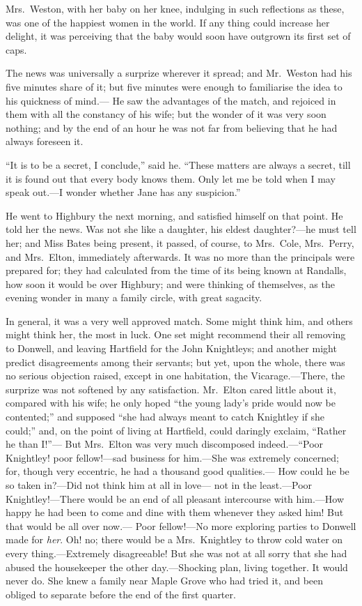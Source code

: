 Mrs.\ Weston, with her baby on her knee, indulging in such reflections
as these, was one of the happiest women in the world.  If any thing
could increase her delight, it was perceiving that the baby would
soon have outgrown its first set of caps.

The news was universally a surprize wherever it spread;
and Mr.\ Weston had his five minutes share of it; but five minutes
were enough to familiarise the idea to his quickness of mind.---%
He saw the advantages of the match, and rejoiced in them with all
the constancy of his wife; but the wonder of it was very soon nothing;
and by the end of an hour he was not far from believing that he
had always foreseen it.

``It is to be a secret, I conclude,'' said he.  ``These matters are
always a secret, till it is found out that every body knows them.
Only let me be told when I may speak out.---I wonder whether Jane has
any suspicion.''

He went to Highbury the next morning, and satisfied himself on
that point.  He told her the news.  Was not she like a daughter,
his eldest daughter?---he must tell her; and Miss Bates being present,
it passed, of course, to Mrs.\ Cole, Mrs.\ Perry, and Mrs.\ Elton,
immediately afterwards.  It was no more than the principals were
prepared for; they had calculated from the time of its being known
at Randalls, how soon it would be over Highbury; and were thinking
of themselves, as the evening wonder in many a family circle,
with great sagacity.

In general, it was a very well approved match.  Some might think him,
and others might think her, the most in luck.  One set might
recommend their all removing to Donwell, and leaving Hartfield
for the John Knightleys; and another might predict disagreements
among their servants; but yet, upon the whole, there was no serious
objection raised, except in one habitation, the Vicarage.---There,
the surprize was not softened by any satisfaction.  Mr.\ Elton
cared little about it, compared with his wife; he only hoped ``the
young lady's pride would now be contented;'' and supposed ``she had
always meant to catch Knightley if she could;'' and, on the point
of living at Hartfield, could daringly exclaim, ``Rather he than I!''---%
But Mrs.\ Elton was very much discomposed indeed.---``Poor Knightley!
poor fellow!---sad business for him.---She was extremely concerned;
for, though very eccentric, he had a thousand good qualities.---%
How could he be so taken in?---Did not think him at all in love---%
not in the least.---Poor Knightley!---There would be an end of all
pleasant intercourse with him.---How happy he had been to come and dine
with them whenever they asked him!  But that would be all over now.---%
Poor fellow!---No more exploring parties to Donwell made for \emph{her}.
Oh! no; there would be a Mrs.\ Knightley to throw cold water on
every thing.---Extremely disagreeable!  But she was not at all sorry
that she had abused the housekeeper the other day.---Shocking plan,
living together.  It would never do.  She knew a family near Maple
Grove who had tried it, and been obliged to separate before the end
of the first quarter.



